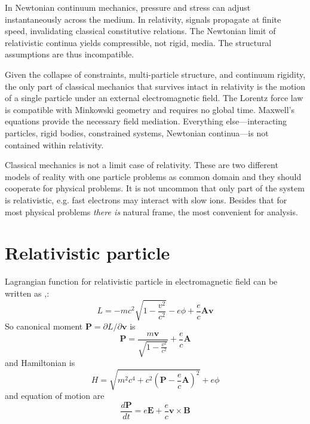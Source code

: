 In Newtonian continuum mechanics, pressure and stress can adjust 
instantaneously across the medium. In relativity, signals propagate 
at finite speed, invalidating classical constitutive relations. 
The Newtonian limit of relativistic continua yields compressible, 
not rigid, media. The structural assumptions are thus incompatible.

Given the collapse of constraints, multi-particle structure, 
and continuum rigidity, the only part of classical mechanics 
that survives intact in relativity is the motion of a single 
particle under an external electromagnetic field. 
The Lorentz force law is compatible with Minkowski geometry and 
requires no global time. Maxwell's equations provide the necessary field mediation.
Everything else---interacting particles, rigid bodies, 
constrained systems, Newtonian continua---is not contained within relativity.

Classical mechanics is not a limit case of relativity. 
These are two different models of reality with one particle
problems as common domain and they should cooperate for
physical problems. It is not uncommon that only part of
the system is relativistic, e.g. fast electrons may
interact with slow ions. Besides that for most physical
problems {\em there is} natural frame, the most convenient
for analysis.

\section{Relativistic particle}
\label {sec:sr-relativistic-particle}

 Lagrangian function for relativistic
particle in electromagnetic field can be written as
\cite{LandauLifshitz-2},\cite{GoldsteinPooleSafko2000}:
\begin{equation}
   \label {lagr-3d}
   L=-m c^2 \sqrt{1-\frac{v^2}{c^2}} - e \phi + \frac{e}{c} \bm A \bm v
\end{equation}
So canonical moment $ \bm P = \partial L/\partial \bm v $ is
\begin{equation}
   \label {mon-3d}
    \bm P=\frac{m \bm v}{\sqrt{1-\frac{v^2}{c^2}}} +\frac{e}{c} \bm A 
\end{equation}
and Hamiltonian is
\begin{equation}
   \label {ham-3d}
    H=\sqrt{m^2 c^4+c^2 (\bm P -\frac{e}{c} \bm A)^2} +e \phi
\end{equation}
and equation of motion are
\begin{equation}
   \label {eqm-3d}
   \frac{d \bm P}{d t}=e \bm E + \frac{e}{c} \bm v \times \bm B
\end{equation}

